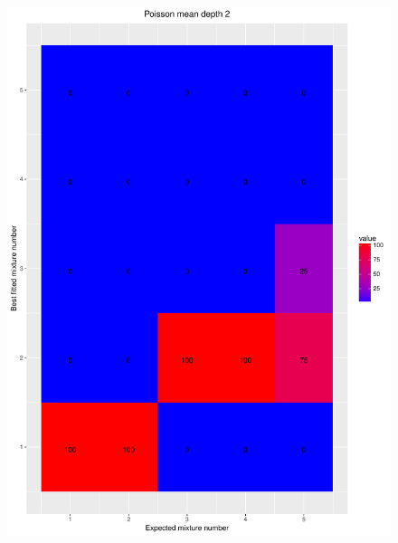 \documentclass[11pt]{article}
\begin{document}
\begin{figure}[H]
\begin{center}
\includegraphics[scale=0.27]{../Results/Second_Analysis/Poisson_Confusion_Matrix_2.pdf}

\end{center}
\end{figure}
\end{document}
